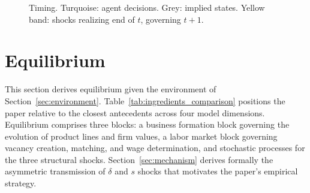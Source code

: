 \documentclass[authoryear, review, 12pt]{elsarticle}
\begin{document}
\begin{figure}[H]
{}
		\caption{Timing. Turquoise: agent decisions. Grey: implied states. 
			Yellow band: shocks realizing end of $t$, governing $t{+}1$.}
		\label{fig:Timing}
	\end{figure}
	
	\section{Equilibrium}\label{sec:equilibrium}
	
	This section derives equilibrium given the environment of 
	Section~\ref{sec:environment}. Table~\ref{tab:ingredients_comparison} 
	positions the paper relative to the closest antecedents across 
	four model dimensions. Equilibrium comprises three blocks: a 
	business formation block governing the evolution of product lines 
	and firm values, a labor market block governing vacancy creation, 
	matching, and wage determination, and stochastic processes for 
	the three structural shocks. Section~\ref{sec:mechanism} derives 
	formally the asymmetric transmission of $\delta$ and $s$ shocks 
	that motivates the paper's empirical strategy.
	
\end{document}
